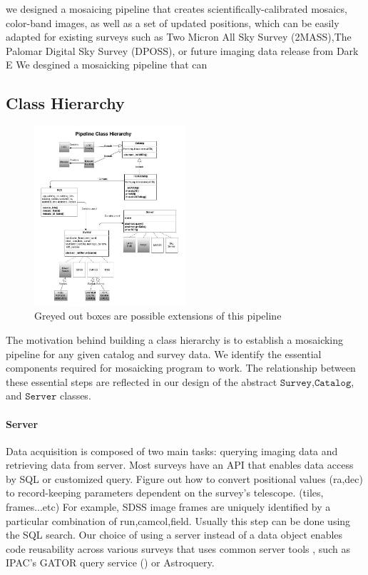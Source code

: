 \documentclass[5p]{elsarticle}
\begin{document}
we designed a mosaicing pipeline that creates scientifically-calibrated mosaics, color-band images, as well as a set of updated positions, which can be easily adapted for existing surveys such as Two Micron All Sky Survey  (2MASS),The Palomar Digital Sky Survey (DPOSS), or future imaging data release from  Dark E
We desgined a mosaicking pipeline that can 
	\subsection{Class Hierarchy}
	\begin{figure}[h]
		\includegraphics[width=0.5\textwidth]{pipeline}
		\caption{Greyed out boxes are possible extensions of this pipeline}
	\end{figure}
 	The motivation behind building a class hierarchy is to establish a mosaicking pipeline for any given catalog and survey data. We identify the essential components required for mosaicking program to work. The relationship between these essential steps are reflected in our design of the abstract $\texttt{Survey}$,$\texttt{Catalog}$, and $\texttt{Server}$ classes. 
 		\paragraph{Server}
		Data acquisition is composed of two main tasks: querying imaging data and retrieving data from server. Most surveys have an API that enables data access by SQL or customized query. Figure out how to convert positional values (ra,dec) to record-keeping parameters dependent on the survey's telescope. (tiles, frames...etc) For example, SDSS image frames are uniquely identified by a particular combination of  run,camcol,field.  Usually this step can be done using the SQL search. Our choice of using a server instead of a data object enables code reusability across various surveys that uses common server tools , such as IPAC's GATOR query service (\citet{irsa}) or  Astroquery.
\end{document}
